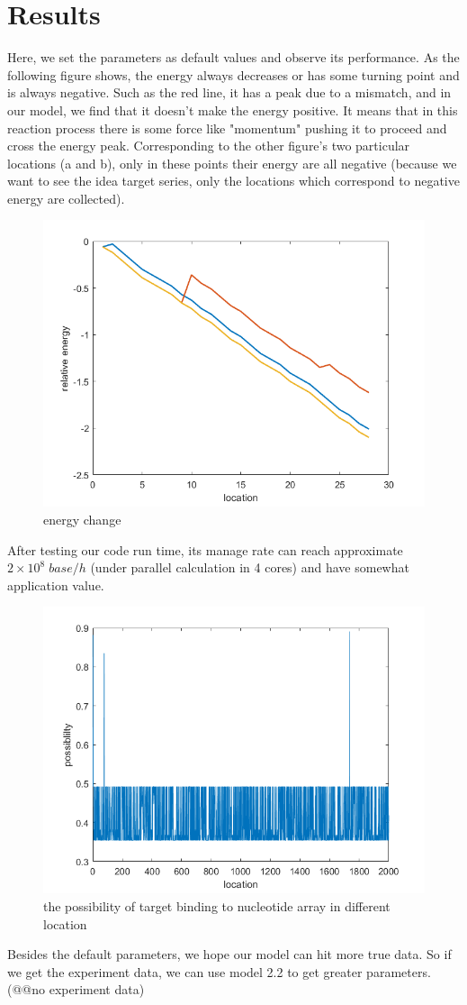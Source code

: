 \section{Results}
Here, we set the parameters as default values and observe its performance. As the following figure shows, the energy always decreases or has some turning point and is always negative. Such as the red line, it has a peak due to a mismatch, and in our model, we find that it doesn't make the energy positive. It means that in this reaction process there is some force like "momentum" pushing it to proceed and cross the energy peak. Corresponding to the other figure's two particular locations (a and b), only in these points their energy are all negative (because we want to see the idea target series, only the locations which correspond to negative energy are collected).
\begin{figure}[h]
\centering
\includegraphics[width=0.7\linewidth]{energy_change}
\caption{energy change}
\label{fig:energychange}
\end{figure}

After testing our code run time, its manage rate can reach approximate $2\times10^8\;base/h$ (under parallel calculation in 4 cores) and have somewhat application value. 

\begin{figure}[h]
\centering
\includegraphics[width=0.7\linewidth]{fig1}
\caption{the possibility of target binding to nucleotide array in different location}
\label{}
\end{figure}

Besides the default parameters, we hope our model can hit more true data. So if we get the experiment data, we can use model 2.2 to get greater parameters. (@@no experiment data) 
